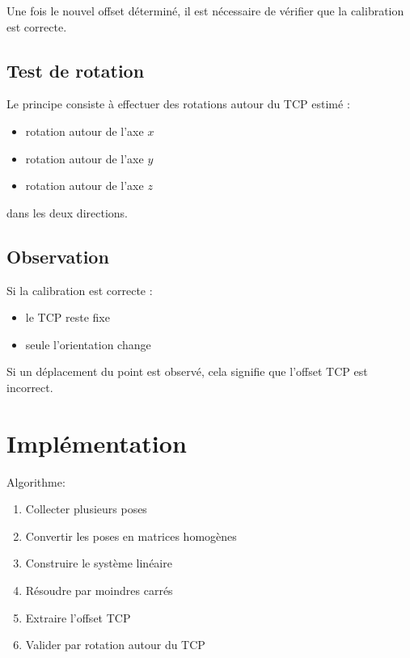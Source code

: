 \documentclass[a4paper,11pt]{article}
\begin{document}
Une fois le nouvel offset déterminé, il est nécessaire de vérifier que la calibration est correcte.

\subsection{Test de rotation}

Le principe consiste à effectuer des rotations autour du TCP estimé :

\begin{itemize}
\item rotation autour de l’axe $x$
\item rotation autour de l’axe $y$
\item rotation autour de l’axe $z$
\end{itemize}

dans les deux directions.

\subsection{Observation}

Si la calibration est correcte :

\begin{itemize}
\item le TCP reste fixe
\item seule l’orientation change
\end{itemize}

Si un déplacement du point est observé, cela signifie que l’offset TCP est incorrect.

\section{Implémentation}

Algorithme:

\begin{enumerate}

\item Collecter plusieurs poses
\item Convertir les poses en matrices homogènes
\item Construire le système linéaire
\item Résoudre par moindres carrés
\item Extraire l’offset TCP
\item Valider par rotation autour du TCP

\end{enumerate}
\end{document}
